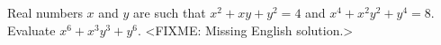 \problem
Real numbers $x$ and $y$ are such that
$x^2 + x y + y^2 = 4$ and $x^4 + x^2 y^2 + y^4 = 8$.
Evaluate $x^6 + x^3 y^3 + y^6$.
\solution
<FIXME: Missing English solution.>
\endproblem
